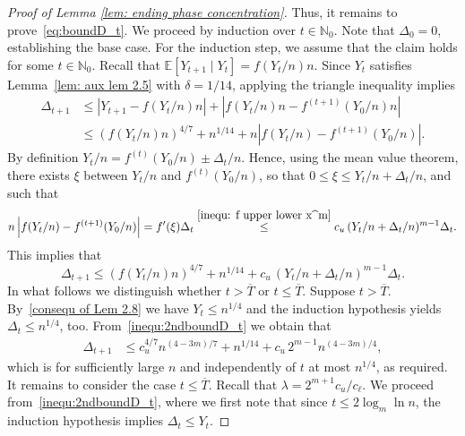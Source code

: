 \documentclass[11pt]{article}
\numberwithin{theorem}{section}
\begin{document}
\begin{proof}[Proof of Lemma \ref{lem: ending phase concentration}]
Thus, it remains to prove~\eqref{eq:boundD_t}. We proceed by induction over $t \in \mathbb{N}_0$. Note that $\Delta_{0}=0$, establishing the base case. For the induction step, we assume that the claim holds for some $t\in \mathbb{N}_0$.
Recall that $\mathbb{E}[Y_{t+1}\mid Y_t] = f(Y_t/n)n$. Since $Y_t$ satisfies Lemma~\ref{lem: aux lem 2.5} with $\delta = 1/14$, applying the triangle inequality implies
\begin{equation}\label{inequ: first bound delta}
\begin{aligned}
    \Delta_{t+1} &\leq \left|Y_{t+1}-f(Y_t/n)n \right| +\left|f(Y_t/n)n -  f^{(t+1)}(Y_0/n)n \right| \\
    &\leq (f(Y_t/n)n)^{4/7} + n^{1/14} + n\left|f(Y_t/n) -  f^{(t+1)}(Y_0/n) \right|.
\end{aligned}
\end{equation}
By definition $Y_t/n = f^{(t)}(Y_0/n) \pm \Delta_{t}/n$. Hence, using the mean value theorem, there exists $\xi$ between $Y_t/n$ and $f^{(t)}(Y_0/n)$, so that $0\leq \xi \leq Y_t/n + \Delta_t/n$, and such that
\begin{align*}
\label{inequ: second summand1}
    n \left|f(Y_t/n) -  f^{(t+1)}(Y_0/n) \right|
    = f'(\xi)\Delta_t
    \stackrel{\eqref{inequ: f upper lower x^m}}{\leq}c_u\, (Y_t/n +\Delta_t/n)^{m-1}  \Delta_t.
\end{align*}
This implies that 
\begin{equation}
\label{inequ:2ndboundD_t}
    \Delta_{t+1}
    \le
    (f(Y_t/n)n)^{4/7} + n^{1/14} + c_u\, (Y_t/n +\Delta_t/n)^{m-1}  \Delta_t.
\end{equation}
In what follows we distinguish whether $t > \overline{T}$ or $t \le \overline{T}$.
Suppose $t > \overline{T}$. 
By~\eqref{consequ of Lem 2.8} we have $Y_t\leq n^{1/4}$ and the induction hypothesis yields $\Delta_t\leq n^{1/4}$, too. 
From~\eqref{inequ:2ndboundD_t} we obtain that
    \begin{align*}
    \Delta_{t+1}
    &\leq c_u^{4/7}n^{(4-3m)/7}+n^{1/14}+c_u\,2^{m-1}n^{(4-3m)/4},
    \end{align*}
    which is for sufficiently large $n$ and independently of $t$ at most $n^{1/4}$, as required.
    It remains to consider the case $t\leq \overline{T}$.
Recall that $\lambda=2^{m+1}c_u/c_\ell$. We proceed from~\eqref{inequ:2ndboundD_t}, where we first note that since $t\leq2\log_m\ln n$, the induction hypothesis implies $\Delta_t\leq Y_t$.

\end{proof}
\end{document}
